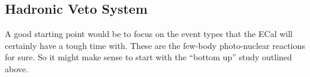 
\subsection{Hadronic Veto System}

A good starting point would be to focus on the event types that the ECal will certainly have a tough time with. These are the few-body photo-nuclear reactions for sure. So it might make sense to start with the ``bottom up'' study outlined above. 

